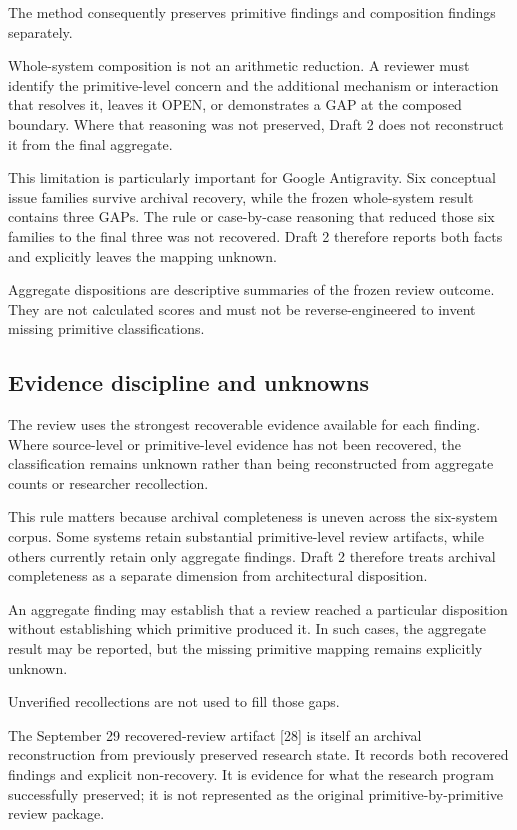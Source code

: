 \documentclass[11pt]{article}
\begin{document}
The method consequently preserves primitive findings and composition findings separately.

Whole-system composition is not an arithmetic reduction. A reviewer must identify the primitive-level concern and the additional mechanism or interaction that resolves it, leaves it OPEN, or demonstrates a GAP at the composed boundary. Where that reasoning was not preserved, Draft 2 does not reconstruct it from the final aggregate.

This limitation is particularly important for Google Antigravity. Six conceptual issue families survive archival recovery, while the frozen whole-system result contains three GAPs. The rule or case-by-case reasoning that reduced those six families to the final three was not recovered. Draft 2 therefore reports both facts and explicitly leaves the mapping unknown.

Aggregate dispositions are descriptive summaries of the frozen review outcome. They are not calculated scores and must not be reverse-engineered to invent missing primitive classifications.

\subsection{Evidence discipline and unknowns}

The review uses the strongest recoverable evidence available for each finding. Where source-level or primitive-level evidence has not been recovered, the classification remains unknown rather than being reconstructed from aggregate counts or researcher recollection.

This rule matters because archival completeness is uneven across the six-system corpus. Some systems retain substantial primitive-level review artifacts, while others currently retain only aggregate findings. Draft 2 therefore treats archival completeness as a separate dimension from architectural disposition.

An aggregate finding may establish that a review reached a particular disposition without establishing which primitive produced it. In such cases, the aggregate result may be reported, but the missing primitive mapping remains explicitly unknown.

Unverified recollections are not used to fill those gaps.

The September 29 recovered-review artifact [28] is itself an archival reconstruction from previously preserved research state. It records both recovered findings and explicit non-recovery. It is evidence for what the research program successfully preserved; it is not represented as the original primitive-by-primitive review package.
\end{document}
